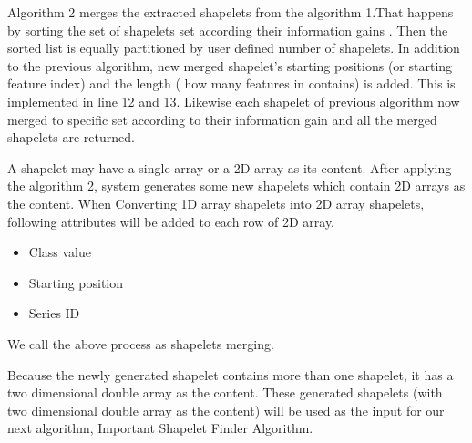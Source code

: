 \documentclass[letterpaper, 10 pt, conference]{IEEEtran}  %
\begin{document}
Algorithm 2 merges the extracted shapelets from the algorithm 1.That happens by sorting the set of shapelets set according their information gains . Then the sorted list is equally partitioned by user defined number of shapelets. In addition to the previous algorithm, new merged shapelet’s starting positions (or starting feature index) and the length ( how many features in contains) is added. This is implemented in line 12 and 13. Likewise each shapelet of previous algorithm now merged to specific set according to their information gain and all the merged shapelets are returned.

A shapelet may have a single array or a 2D array as its content. After applying the algorithm 2, system generates some new shapelets which contain 2D arrays as the content. When Converting 1D array shapelets into 2D array shapelets, following attributes will be added to each row of 2D array.
\begin{itemize}
\item Class value
\item Starting position
\item Series ID
\end{itemize}
We call the above process as shapelets merging.

Because the newly generated shapelet contains more than one shapelet, it has a two dimensional double array as the content. These generated shapelets (with two dimensional double array as the content) will be used as the input for our next algorithm, Important Shapelet Finder Algorithm. 
\end{document}
